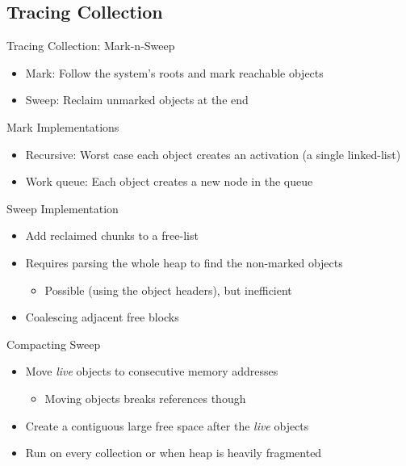 \documentclass[
14pt,
aspectratio=169,
usenames,
dvipsnames,
x11names]{beamer}
\begin{document}
\subsection{Tracing Collection}

\begin{frame}{Tracing Collection: Mark-n-Sweep}
  \begin{itemize}  \setlength{\itemsep}{\fill}
  \item Mark: Follow the system's roots and \alert{mark reachable objects}
  \item Sweep: \alert{Reclaim unmarked objects} at the end
  \end{itemize}
\end{frame}

\begin{frame}{Mark Implementations}
  \begin{itemize}  \setlength{\itemsep}{\fill}
  \item \alert{Recursive}: Worst case each object creates an activation (a single linked-list)
  \item \alert{Work queue}: Each object creates a new node in the queue
  \end{itemize}
\end{frame}

\begin{frame}{Sweep Implementation}
  \begin{itemize}  \setlength{\itemsep}{\fill}
  \item Add reclaimed chunks to a \alert{free-list}
  \item Requires \alert{parsing the whole heap} to find the non-marked objects
    \begin{itemize}
    \item  Possible (using the object headers), but \alert{inefficient}
    \end{itemize}
  \item \alert{Coalescing} adjacent free blocks
  \end{itemize}
\end{frame}

\begin{frame}{Compacting Sweep}
  \begin{itemize}  \setlength{\itemsep}{\fill}
  \item Move \textit{live} objects to consecutive memory addresses
    \begin{itemize}
    \item Moving objects \alert{breaks references} though
    \end{itemize}
  \item Create a \alert{contiguous large free space} after the \textit{live} objects
  \item Run on \alert{every collection} or when heap is \alert{heavily fragmented}
  \end{itemize}
\end{frame}
\end{document}
